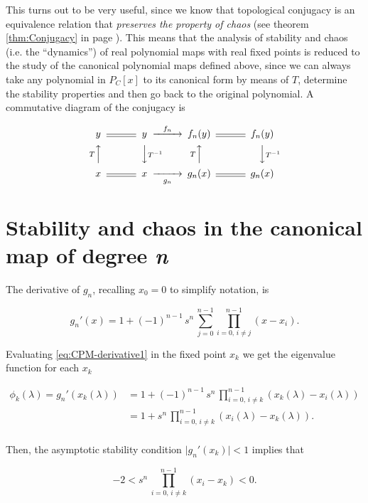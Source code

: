 \documentclass[10pt,twoside,titlepage]{book}
\numberwithin{equation}{chapter}
\numberwithin{figure}{chapter}
\numberwithin{table}{chapter}
\theoremstyle{plain}%
\theoremstyle{definition}
\theoremstyle{remark}
\begin{document}
This turns out to be very useful, since we know that topological conjugacy is an equivalence relation that \emph{preserves the property of chaos} (see theorem \ref{thm:Conjugacy} in page \pageref{thm:Conjugacy}). This means that the analysis of stability and chaos (i.e. the ``dynamics'') of real polynomial maps with real fixed points is reduced to the study of the canonical polynomial maps defined above, since we can always take any polynomial in $P_C[x]$ to its canonical form by means of $T$, determine the stability properties and then go back to the original polynomial. A commutative diagram of the conjugacy is

\begin{equation}
	\begin{CD}
		y		@=	y				@>{f_n}>>	f_n(y)		@= 	f_n(y)\\
		@A{T}AA		@VV{T^{-1}}V				@A{T}AA			@VV{T^{-1}}V\\
		x		@=	x				@>>g_n>		g_n(x)		@=	g_n(x)
	\end{CD}
\end{equation}


\section{Stability and chaos in the canonical map of degree \textit{n}}

The derivative of $g_n$, recalling $x_0=0$ to simplify notation, is

\begin{equation}
	g_n'(x)=1+(-1)^{n-1}\,s^n\,\sum_{j=0}^{n-1}\prod_{i=0,\,i\neq j}^{n-1}(x-x_i).
	\label{eq:CPM-derivative1}
\end{equation}

Evaluating \eqref{eq:CPM-derivative1} in the fixed point $x_k$ we get the eigenvalue function for each $x_k$

\begin{equation}
	\begin{aligned}
		\phi_k(\lambda)=g_n'(x_k(\lambda))	&=1+(-1)^{n-1}\,s^n\,\prod_{i=0,\,i\neq k}^{n-1}(x_k(\lambda)-x_i(\lambda)) \\
		&=1+s^n\,\prod_{i=0,\,i\neq k}^{n-1}(x_i(\lambda)-x_k(\lambda)). \\
	\end{aligned}
\end{equation}

Then, the asymptotic stability condition $\vert g_n'(x_k)\vert <1$ implies that

\begin{equation}
	-2<s^n\,\prod_{i=0,\,i\neq k}^{n-1}(x_i-x_k)<0.
	\label{eq:CPM-stbcond}
\end{equation}
\end{document}
